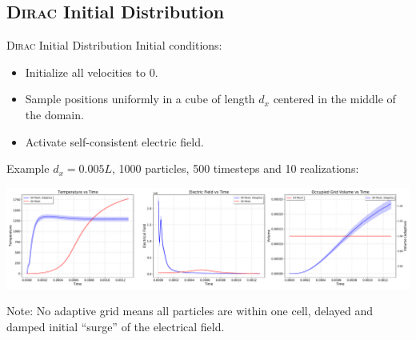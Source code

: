 \subsection{\textsc{Dirac} Initial Distribution}

\begin{frame}{\textsc{Dirac} Initial Distribution}
    Initial conditions:
    \begin{itemize}
        \item Initialize all velocities to $0$.
        \item Sample positions uniformly in a cube of length $d_x$ centered in the middle of the domain.
        \item Activate self-consistent electric field.
    \end{itemize}
    \vfill
    Example $d_x = 0.005 L$, 1000 particles, 500 timesteps and 10 realizations:
    \begin{minipage}{\textwidth}
        \centering
        \includegraphics[width=\textwidth]{ressources/test2/T_E_V_comparison_adaptive_mesh_0.005.pdf}
    \end{minipage}
    Note: No adaptive grid means all particles are within one cell, delayed and damped initial ``surge'' of the electrical field. 
\end{frame}

